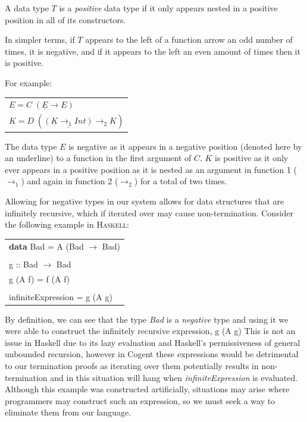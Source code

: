 \theoremstyle{definition}
\begin{definition}
    A data type $T$ is a \textit{positive} data type if it only appears nested in a positive position
    in all of its constructors.
\end{definition}

In simpler terms, if $T$ appears to the left of a function arrow an odd number of times, it is negative,
and if it appears to the left an even amount of times then it is positive.

For example:

\begin{center}
    \begin{tabular}{l}
        $E = C\; (\underline{E} \rightarrow E)$ \\
        $K = D\; (\underline{(\underline{K} \rightarrow_1 Int)} \rightarrow_2 K)$
    \end{tabular} 
\end{center}

The data type $E$ is negative as it appears in a negative position (denoted here by an underline)
to a function in the first argument of $C$.
$K$ is positive as it only ever appears in a positive position as it is nested as an argument
in function 1 ($\rightarrow_1$) and again in function 2 ($\rightarrow_2$) for a total of two times.

Allowing for negative types in our system allows for data structures that are infinitely recursive,
which if iterated over may cause non-termination. Consider the following example in \textsc{Haskell}:

\begin{center}
    \begin{tabular}{l}
            \textbf{data} \textsf{Bad = A (Bad $\rightarrow$ Bad)} \\ \\

            \textsf{g :: Bad $\rightarrow$ Bad} \\
            \textsf{g (A f) = f (A f)} \\ \\

            \textsf{infiniteExpression = g (A g)}
    \end{tabular} 
\end{center}

By definition, we can see that the type \textit{Bad} is a \textit{negative} type and using it we were able
to construct the infinitely recursive expression, \textsf{g (A g)}
This is not an issue in Haskell due to its lazy evaluation and  Haskell's permissiveness of general unbounded recursion,
however in Cogent these expressions would be detrimental to our termination
proofs as iterating over them potentially results in non-termination and in this
situation will hang when \textit{infiniteExpression} is evaluated.
Although this example was constructed artificially, situations may arise where
programmers may construct such an expression, so we must seek a way to
eliminate them from our language.

